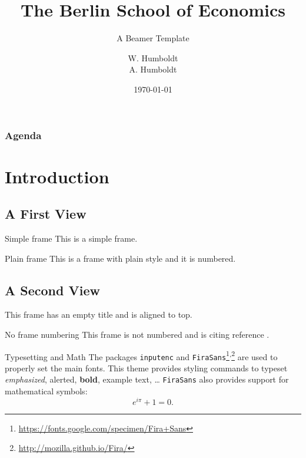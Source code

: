 \documentclass{beamer}
\title{The Berlin School of Economics}
\subtitle{A Beamer Template}
\author{W. Humboldt\texorpdfstring{\\}{,} A. Humboldt}
\institute{Berlin School of Economics}
\date{\today}
\begin{document}
    \begin{frame}
        \maketitle
    \end{frame}
    
    \begin{frame}[t]\frametitle{Agenda}
        \tableofcontents
    \end{frame}

    \section{Introduction}
    \subsection{A First View}
    \begin{frame}{Simple frame}
        This is a simple frame.
    \end{frame}

    \begin{frame}[plain]{Plain frame}
        This is a frame with plain style and it is numbered.
    \end{frame}
    
    \subsection{A Second View}
    \begin{frame}[t]
        This frame has an empty title and is aligned to top.
    \end{frame}
    
    \begin{frame}[noframenumbering]{No frame numbering}
        This frame is not numbered and is citing reference \cite{knuth74}.
    \end{frame}
    
    \begin{frame}{Typesetting and Math}
        The packages \texttt{inputenc} and \texttt{FiraSans}\footnote{\url{https://fonts.google.com/specimen/Fira+Sans}}\textsuperscript{,}\footnote{\url{http://mozilla.github.io/Fira/}} are used to properly set the main fonts.
        \vfill
        This theme provides styling commands to typeset \emph{emphasized}, \alert{alerted}, \textbf{bold}, \textcolor{example}{example text}, \dots
        \vfill
        \texttt{FiraSans} also provides support for mathematical symbols:
        \begin{equation*}
            e^{i\pi} + 1 = 0.
        \end{equation*}
    \end{frame}
\end{document}
